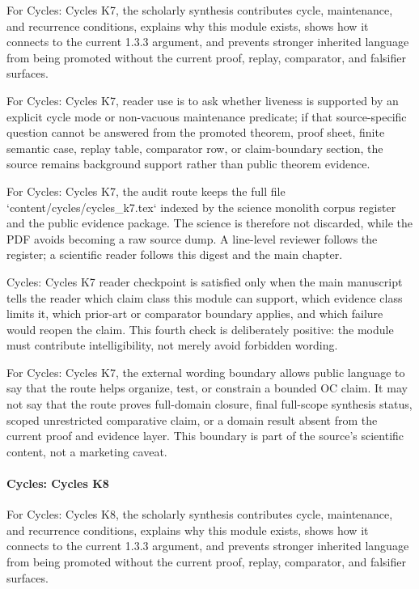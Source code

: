 For Cycles: Cycles K7, the scholarly synthesis contributes cycle, maintenance, and recurrence conditions, explains why this module exists, shows how it connects to the current 1.3.3 argument, and prevents stronger inherited language from being promoted without the current proof, replay, comparator, and falsifier surfaces.


For Cycles: Cycles K7, reader use is to ask whether liveness is supported by an explicit cycle mode or non-vacuous maintenance predicate; if that source-specific question cannot be answered from the promoted theorem, proof sheet, finite semantic case, replay table, comparator row, or claim-boundary section, the source remains background support rather than public theorem evidence.


For Cycles: Cycles K7, the audit route keeps the full file `content/cycles/cycles\_k7.tex` indexed by the science monolith corpus register and the public evidence package. The science is therefore not discarded, while the PDF avoids becoming a raw source dump. A line-level reviewer follows the register; a scientific reader follows this digest and the main chapter.


Cycles: Cycles K7 reader checkpoint is satisfied only when the main manuscript tells the reader which claim class this module can support, which evidence class limits it, which prior-art or comparator boundary applies, and which failure would reopen the claim. This fourth check is deliberately positive: the module must contribute intelligibility, not merely avoid forbidden wording.


For Cycles: Cycles K7, the external wording boundary allows public language to say that the route helps organize, test, or constrain a bounded OC claim. It may not say that the route proves full-domain closure, final full-scope synthesis status, scoped unrestricted comparative claim, or a domain result absent from the current proof and evidence layer. This boundary is part of the source's scientific content, not a marketing caveat.


\paragraph{Cycles: Cycles K8}

For Cycles: Cycles K8, the scholarly synthesis contributes cycle, maintenance, and recurrence conditions, explains why this module exists, shows how it connects to the current 1.3.3 argument, and prevents stronger inherited language from being promoted without the current proof, replay, comparator, and falsifier surfaces.


